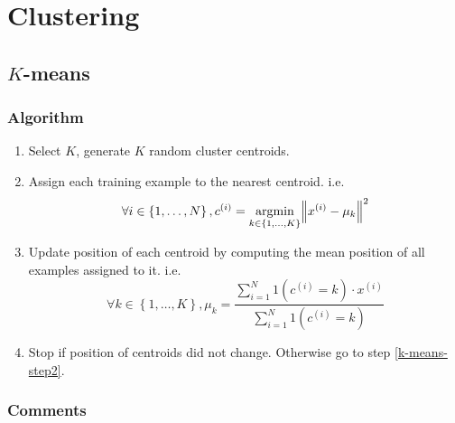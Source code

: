 \documentclass[twocolumn,landscape,10pt]{article}
\theoremstyle{definition}
\begin{document}
\section{Clustering}

\subsection{$K$-means}

\subsubsection{Algorithm}
\begin{enumerate}
    \item Select $K$, generate $K$ random cluster centroids.
    \item \label{k-means-step2} Assign each training example to the nearest
        centroid. i.e.\
        \[
            \forall i\in\left\{1,\ldots,N\right\},
            c^{(i)}=\underset{k\in\left\{1,\ldots,K\right\}}{\text{argmin}}
            \norm{x^{(i)}-\mu_k}^{2}
        \]
    \item \label{k-means-step3}Update position of each centroid by computing the mean position of all
        examples assigned to it. i.e.\
        \[
            \forall k\in\left\{1,\ldots,K\right\},
            \mu_k=\frac{\sum_{i=1}^{N} 1(c^{(i)}=k)\cdot x^{(i)}}{\sum_{i=1}^{N}
            1(c^{(i)}=k)}
        \]
    \item Stop if position of centroids did not change. Otherwise go to step
        \ref{k-means-step2}.
\end{enumerate} 

\subsubsection{Comments}
\end{document}
